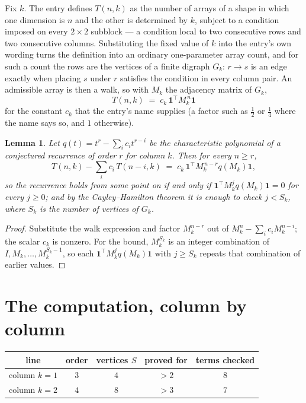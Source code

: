 \documentclass[11pt,a4paper]{article}
\theoremstyle{plain}
\newtheorem{lemma}[theorem]{Lemma}
\theoremstyle{definition}
\begin{document}
Fix $k$. The entry defines $T(n,k)$ as the number of arrays of a shape in which one dimension
is $n$ and the other is determined by $k$, subject to a condition imposed on every
$2\times2$ subblock --- a condition local to two consecutive rows and two consecutive columns.
Substituting the fixed value of $k$ into the entry's own wording turns the definition into an
ordinary one-parameter array count, and for such a count the rows are the vertices of a finite
digraph $G_k$: $r\to s$ is an edge exactly when placing $s$ under $r$ satisfies the condition
in every column pair. An admissible array is then a walk, so with $M_k$ the adjacency matrix
of $G_k$,
\[
T(n,k)\;=\;c_k\,\mathbf{1}^{\!\top}M_k^{\,n}\mathbf{1}
\]
for the constant $c_k$ that the entry's name supplies (a factor such as $\tfrac12$ or
$\tfrac14$ where the name says so, and $1$ otherwise).

\begin{lemma}\label{lem:crit}
Let $q(t)=t^{r}-\sum_i c_it^{r-i}$ be the characteristic polynomial of a conjectured
recurrence of order $r$ for column $k$. Then for every $n\ge r$,
\[
T(n,k)-\sum_i c_i\,T(n-i,k)\;=\;c_k\,\mathbf{1}^{\!\top}M_k^{\,n-r}q(M_k)\mathbf{1},
\]
so the recurrence holds from some point on if and only if
$\mathbf{1}^{\!\top}M_k^{j}q(M_k)\mathbf{1}=0$ for every $j\ge0$; and by the
Cayley--Hamilton theorem it is enough to check $j<S_k$, where $S_k$ is the number of vertices
of $G_k$.
\end{lemma}

\begin{proof}
Substitute the walk expression and factor $M_k^{n-r}$ out of $M_k^{n}-\sum_ic_iM_k^{n-i}$;
the scalar $c_k$ is nonzero. For the bound, $M_k^{S_k}$ is an integer combination of
$I,M_k,\dots,M_k^{S_k-1}$, so each $\mathbf{1}^{\!\top}M_k^{j}q(M_k)\mathbf{1}$ with
$j\ge S_k$ repeats that combination of earlier values.
\end{proof}

\section{The computation, column by column}

\begin{center}
\begin{tabular}{ccccc}
line & order & vertices $S$ & proved for & terms checked \\ \hline
column $k$$=1$ & $3$ & $4$ & $>2$ & $8$ \\
column $k$$=2$ & $4$ & $8$ & $>3$ & $7$ \\
\end{tabular}
\end{center}
\end{document}
